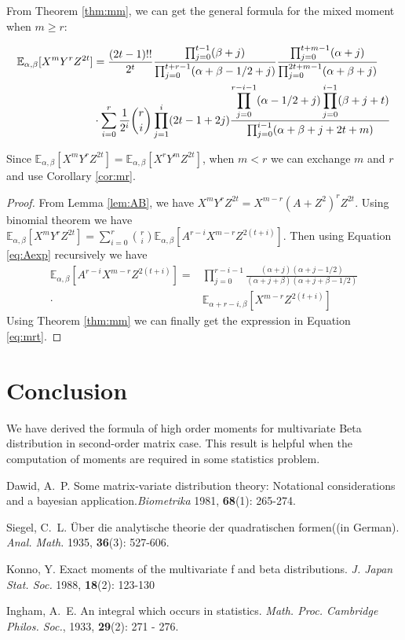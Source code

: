\documentclass[twoside]{article}%
\def\E{\mathbb{E}}
\begin{document}
From Theorem \ref{thm:mm},
we can get
the general formula for the mixed moment when $m\geq r$:
\begin{corollary}\label{cor:mr}
\begin{align}
\E_{\alpha, \beta}[X^mY^rZ^{2t}] &= \frac{(2t-1)!!}{2^t}
\frac{\prod_{j=0}^{t-1} (\beta+j)}{\prod_{j=0}^{t+r-1} (\alpha+\beta-1/2+j)}
\frac{\prod_{j=0}^{t+m-1}(\alpha+j)}{\prod_{j=0}^{2t+m-1} (\alpha+\beta+j)}\notag\\
&\cdot\sum_{i=0}^r \frac{1}{2^i}\binom{r}{i}\prod_{j=1}^i (2t-1+2j)
\frac{\displaystyle\prod_{j=0}^{r-i-1}(\alpha-1/2+j)
\prod_{j=0}^{i-1}(\beta+j+t)}{\prod_{j=0}^{i-1}(\alpha+\beta+j+2t+m)}
\label{eq:mrt}
\end{align}
\end{corollary}
Since $\E_{\alpha, \beta}[X^mY^rZ^{2t}]=\E_{\alpha, \beta}[X^rY^mZ^{2t}]$, 
when $m<r$ we can exchange $m$ and $r$ and use Corollary \ref{cor:mr}.
\begin{proof}
From Lemma \ref{lem:AB}, we have
$X^m Y^r Z^{2t} = X^{m-r}(A+Z^2)^r Z^{2t} $.
Using binomial theorem we have
$\E_{\alpha, \beta}[X^m Y^r Z^{2t}] = \sum_{i=0}^r \binom{r}{i}\E_{\alpha, \beta}
[A^{r-i}X^{m-r}Z^{2(t+i)}]$. Then using Equation \eqref{eq:Aexp} recursively
we have 
\begin{align*}
\E_{\alpha, \beta}
[A^{r-i}X^{m-r}Z^{2(t+i)}] =&
\prod_{j=0}^{r-i-1}\frac{(\alpha+j)(\alpha+j-1/2)}
{(\alpha+j+\beta)(\alpha+j+\beta-1/2)} \\
\cdot & \E_{\alpha+r-i, \beta}
[X^{m-r}Z^{2(t+i)}]
\end{align*}
Using Theorem \ref{thm:mm} we can finally get the expression in
Equation \eqref{eq:mrt}.
\end{proof}
\section{Conclusion}
We have derived the formula of high order moments for multivariate Beta distribution
in second-order matrix case. This result is helpful when the computation of moments
are required in some statistics problem.

\begin{thebibliography}{stringX}
\leftskip=-8mm
\parskip=-1mm
\small

 Dawid, A.~P. Some matrix-variate distribution theory: Notational
  considerations and a bayesian application.{\it Biometrika} 1981, {\bf 68}(1): 265-274.

 Siegel, C.~L. Über die analytische theorie der quadratischen formen((in German).
  {\it Anal. Math.} 1935, {\bf 36}(3): 527-606.

 Konno, Y. Exact moments of the multivariate f and beta distributions.
{\it J. Japan Stat. Soc.} 1988, {\bf 18}(2): 123-130

 Ingham, A.~E. An integral which occurs in statistics. {\it Math. Proc. Cambridge Philos. Soc.}, 1933, {\bf 29}(2): 271 - 276.   %

\end{thebibliography}

\end{document}
